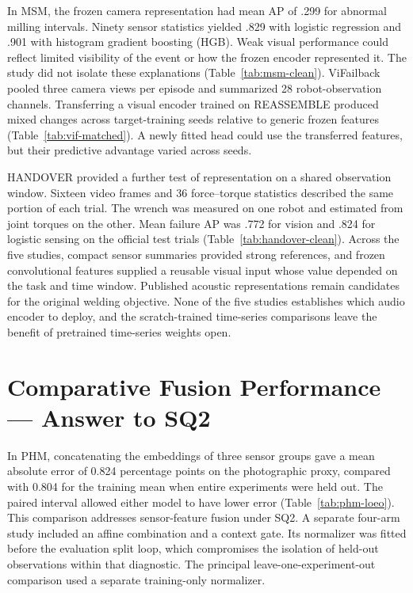 In MSM, the frozen camera representation had mean AP of .299 for abnormal milling intervals. Ninety sensor statistics yielded .829 with logistic regression and .901 with histogram gradient boosting (HGB). Weak visual performance could reflect limited visibility of the event or how the frozen encoder represented it. The study did not isolate these explanations (Table~\ref{tab:msm-clean}). ViFailback pooled three camera views per episode and summarized 28 robot-observation channels. Transferring a visual encoder trained on REASSEMBLE produced mixed changes across target-training seeds relative to generic frozen features (Table~\ref{tab:vif-matched}). A newly fitted head could use the transferred features, but their predictive advantage varied across seeds.

HANDOVER provided a further test of representation on a shared observation window. Sixteen video frames and 36 force--torque statistics described the same portion of each trial. The wrench was measured on one robot and estimated from joint torques on the other. Mean failure AP was .772 for vision and .824 for logistic sensing on the official test trials (Table~\ref{tab:handover-clean}). Across the five studies, compact sensor summaries provided strong references, and frozen convolutional features supplied a reusable visual input whose value depended on the task and time window. Published acoustic representations remain candidates for the original welding objective. None of the five studies establishes which audio encoder to deploy, and the scratch-trained time-series comparisons leave the benefit of pretrained time-series weights open.

\section{Comparative Fusion Performance --- Answer to SQ2}
In PHM, concatenating the embeddings of three sensor groups gave a mean absolute error of 0.824 percentage points on the photographic proxy, compared with 0.804 for the training mean when entire experiments were held out. The paired interval allowed either model to have lower error (Table~\ref{tab:phm-loeo}). This comparison addresses sensor-feature fusion under SQ2. A separate four-arm study included an affine combination and a context gate. Its normalizer was fitted before the evaluation split loop, which compromises the isolation of held-out observations within that diagnostic. The principal leave-one-experiment-out comparison used a separate training-only normalizer.

